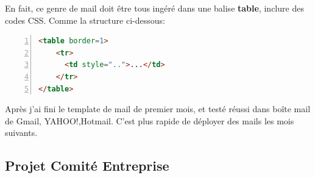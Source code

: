 En fait, ce genre de mail doit être tous ingéré dans une balise \textbf{table}, inclure des codes CSS. Comme la structure ci-dessous:
\begin{lstlisting}[language= html, numbers=left, numberstyle=\tiny,  frame=shadowbox]
<table border=1>
	<tr>
      <td style="..">...</td>
    </tr> 
</table>
\end{lstlisting}

Après j'ai fini le template de mail de premier mois, et testé réussi dans boîte mail de Gmail, YAHOO!,Hotmail. C'est plus rapide de déployer des mails les mois suivants. 
   
\subsection{Projet Comité Entreprise}




